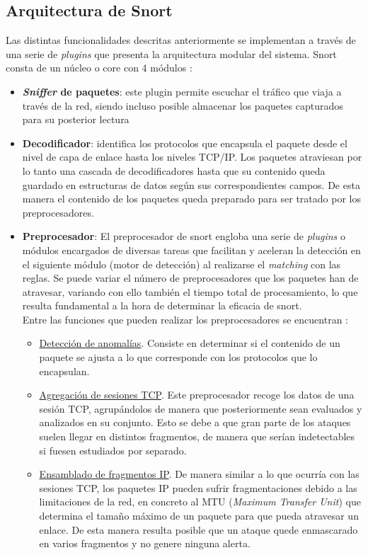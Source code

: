 \subsection{Arquitectura de Snort}
Las distintas funcionalidades descritas anteriormente se implementan a través de una serie de \textit{plugins} que presenta la arquitectura modular del sistema. Snort consta de un núcleo o core con 4 módulos \cite{Shimonski}:
\begin{itemize}
	\item \textbf{\textit{Sniffer} de paquetes}: este plugin permite escuchar el tráfico que viaja a través de la red, siendo incluso posible almacenar los paquetes capturados para su posterior lectura
	\item \textbf{Decodificador}: identifica los protocolos que encapsula el paquete desde el nivel de capa de enlace hasta los niveles TCP/IP. Los paquetes atraviesan por lo tanto una cascada de decodificadores hasta que su contenido queda guardado en estructuras de datos según sus correspondientes campos. De esta manera el contenido de los paquetes queda preparado para ser tratado por los preprocesadores.
	\item \textbf{Preprocesador}: El preprocesador de snort engloba una serie de \textit{plugins} o módulos encargados de diversas tareas que facilitan y aceleran la detección en el siguiente módulo (motor de detección) al realizarse el \textit{matching} con las reglas. Se puede variar el número de preprocesadores que los paquetes han de atravesar, variando con ello también el tiempo total de procesamiento, lo que resulta fundamental a la hora de determinar la eficacia de snort.\\
Entre las funciones que pueden realizar los preprocesadores se encuentran \cite{Syngress}:
\begin{itemize}
	\item \underline{Detección de anomalías}. Consiste en determinar si el contenido de un paquete se ajusta a lo que corresponde con los protocolos que lo encapsulan.
	\item \underline{Agregación de sesiones TCP}. Este preprocesador recoge los datos de una sesión TCP, agrupándolos de manera que posteriormente sean evaluados y analizados en su conjunto. Esto se debe a que gran parte de los ataques suelen llegar en distintos fragmentos, de manera que serían indetectables si fuesen estudiados por separado.
	\item \underline{Ensamblado de fragmentos IP}. De manera similar a lo que ocurría con las sesiones TCP, los paquetes IP pueden sufrir fragmentaciones debido a las limitaciones de la red, en concreto al MTU (\textit{Maximum Transfer Unit}) que determina el tamaño máximo de un paquete para que pueda atravesar un enlace. De esta manera resulta posible que un ataque quede enmascarado en varios fragmentos y no genere ninguna alerta.

\end{itemize}
\end{itemize}
